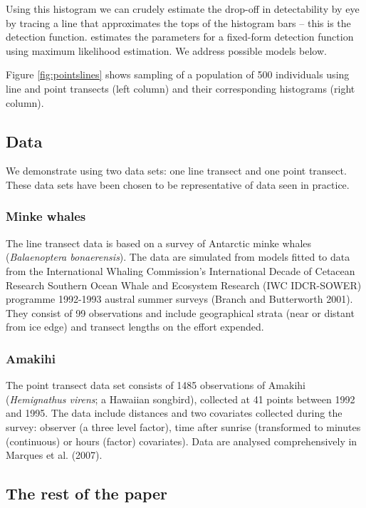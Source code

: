 \documentclass[article]{jss}
\begin{document}
Using this histogram we can crudely estimate the drop-off in
detectability by eye by tracing a line that approximates the tops of the
histogram bars -- this is the detection function. 
estimates the parameters for a fixed-form detection function using
maximum likelihood estimation. We address possible models below.

Figure \ref{fig:pointslines} shows sampling of a population of 500
individuals using line and point transects (left column) and their
corresponding histograms (right column).

\subsection{Data}\label{data}

We demonstrate  using two data sets: one line transect and
one point transect. These data sets have been chosen to be
representative of data seen in practice.

\subsubsection{Minke whales}\label{minke-whales}

The line transect data is based on a survey of Antarctic minke whales
(\emph{Balaenoptera bonaerensis}). The data are simulated from models
fitted to data from the International Whaling Commission's International
Decade of Cetacean Research Southern Ocean Whale and Ecosystem Research
(IWC IDCR-SOWER) programme 1992-1993 austral summer surveys (Branch and
Butterworth 2001). They consist of 99 observations and include
geographical strata (near or distant from ice edge) and transect lengths
on the effort expended.

\subsubsection{Amakihi}\label{amakihi}

The point transect data set consists of 1485 observations of Amakihi
(\emph{Hemignathus virens}; a Hawaiian songbird), collected at 41 points
between 1992 and 1995. The data include distances and two covariates
collected during the survey: observer (a three level factor), time after
sunrise (transformed to minutes (continuous) or hours (factor)
covariates). Data are analysed comprehensively in Marques et al. (2007).

\subsection{The rest of the paper}\label{the-rest-of-the-paper}
\end{document}
